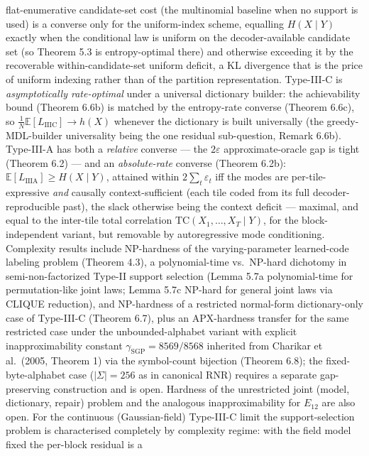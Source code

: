 \documentclass[
]{article}
\begin{document}
flat-enumerative candidate-set cost (the multinomial baseline when no
support is used) is a converse only for the uniform-index scheme,
equalling $H(X \mid Y)$ exactly when the conditional law is uniform on the
decoder-available candidate set (so Theorem 5.3 is entropy-optimal there)
and otherwise exceeding it by the recoverable within-candidate-set
uniform deficit, a KL divergence that is the price of uniform indexing
rather than of the partition representation. Type-III-C is
\emph{asymptotically rate-optimal} under a universal dictionary builder:
the achievability bound (Theorem 6.6b) is matched by the entropy-rate
converse (Theorem 6.6c), so $\tfrac{1}{N}\mathbb{E}[L_{\mathrm{IIIC}}]
\to h(X)$ whenever the dictionary is built universally (the
greedy-MDL-builder universality being the one residual sub-question,
Remark 6.6b). Type-III-A has both a \emph{relative} converse --- the
$2\varepsilon$ approximate-oracle gap is tight (Theorem 6.2) --- and an
\emph{absolute-rate} converse (Theorem 6.2b): $\mathbb{E}[L_{\mathrm{IIIA}}]
\ge H(X\mid Y)$, attained within $2\sum_t\varepsilon_t$ iff the modes are
per-tile-expressive \emph{and} causally context-sufficient (each tile
coded from its full decoder-reproducible past), the slack otherwise being
the context deficit --- maximal, and equal to the inter-tile total
correlation $\mathrm{TC}(X_1,\ldots,X_T\mid Y)$, for the block-independent
variant, but removable by autoregressive mode conditioning. Complexity
results include
NP-hardness of the
varying-parameter learned-code labeling problem (Theorem 4.3), a
polynomial-time vs.\ NP-hard dichotomy in semi-non-factorized
Type-II support selection (Lemma 5.7a polynomial-time for
permutation-like joint laws; Lemma 5.7c NP-hard for general joint
laws via CLIQUE reduction), and NP-hardness of a restricted
normal-form dictionary-only case of Type-III-C (Theorem 6.7), plus
an APX-hardness transfer for the same restricted case under the
unbounded-alphabet variant with explicit inapproximability constant
$\gamma_{\mathrm{SGP}} = 8569/8568$ inherited from Charikar et al.\
(2005, Theorem 1) via the symbol-count bijection (Theorem 6.8); the
fixed-byte-alphabet case ($|\Sigma| = 256$ as in canonical RNR)
requires a separate gap-preserving construction and is open.
Hardness of the unrestricted joint (model, dictionary, repair)
problem and the analogous inapproximability for $E_{12}$ are also
open. For the continuous (Gaussian-field) Type-III-C limit the
support-selection problem is characterised completely by complexity
regime: with the field model fixed the per-block residual is a
\end{document}
